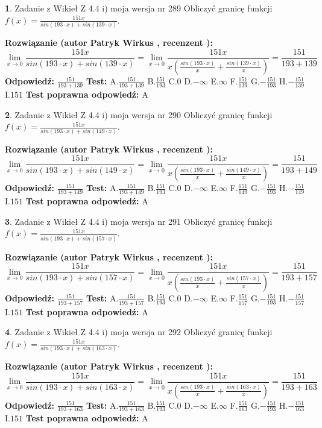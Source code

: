 \documentclass[12pt, a4paper]{article}
\theoremstyle{definition} %
\newtheorem{zad}{}
\newcommand{\zadStart}[1]{\begin{zad}#1\newline}
\newcommand{\zadStop}{\end{zad}}
\newcommand{\rozwStart}[2]{\noindent \textbf{Rozwiązanie (autor #1 , recenzent #2): }\newline}
\newcommand{\rozwStop}{\newline}
\newcommand{\odpStart}{\noindent \textbf{Odpowiedź:}\newline}
\newcommand{\odpStop}{\newline}
\newcommand{\testStart}{\noindent \textbf{Test:}\newline}
\newcommand{\testStop}{\newline}
\newcommand{\kluczStart}{\noindent \textbf{Test poprawna odpowiedź:}\newline}
\newcommand{\kluczStop}{\newline}
\begin{document}
\zadStart{Zadanie z Wikieł Z 4.4 i) moja wersja nr 289}
Obliczyć granicę funkcji $f(x)=\frac{151x}{sin(193\cdot x) +sin(139\cdot x)}$.
\zadStop
\rozwStart{Patryk Wirkus}{}
$$\lim\limits_{x\to 0}\frac{151x}{sin(193\cdot x) +sin(139\cdot x)}=\lim\limits_{x\to 0}\frac{151x}{x(\frac{sin(193\cdot x)}{x}+\frac{sin(139\cdot x)}{x})}=\frac{151}{193+139}$$
\rozwStop
\odpStart
$\frac{151}{193+139}$
\odpStop
\testStart
A.$\frac{151}{193+139}$
B.$\frac{151}{193}$
C.$0$
D.$-\infty$
E.$\infty$
F.$\frac{151}{139}$
G.$-\frac{151}{193}$
H.$-\frac{151}{139}$
I.$151$
\testStop
\kluczStart
A
\kluczStop



\zadStart{Zadanie z Wikieł Z 4.4 i) moja wersja nr 290}
Obliczyć granicę funkcji $f(x)=\frac{151x}{sin(193\cdot x) +sin(149\cdot x)}$.
\zadStop
\rozwStart{Patryk Wirkus}{}
$$\lim\limits_{x\to 0}\frac{151x}{sin(193\cdot x) +sin(149\cdot x)}=\lim\limits_{x\to 0}\frac{151x}{x(\frac{sin(193\cdot x)}{x}+\frac{sin(149\cdot x)}{x})}=\frac{151}{193+149}$$
\rozwStop
\odpStart
$\frac{151}{193+149}$
\odpStop
\testStart
A.$\frac{151}{193+149}$
B.$\frac{151}{193}$
C.$0$
D.$-\infty$
E.$\infty$
F.$\frac{151}{149}$
G.$-\frac{151}{193}$
H.$-\frac{151}{149}$
I.$151$
\testStop
\kluczStart
A
\kluczStop



\zadStart{Zadanie z Wikieł Z 4.4 i) moja wersja nr 291}
Obliczyć granicę funkcji $f(x)=\frac{151x}{sin(193\cdot x) +sin(157\cdot x)}$.
\zadStop
\rozwStart{Patryk Wirkus}{}
$$\lim\limits_{x\to 0}\frac{151x}{sin(193\cdot x) +sin(157\cdot x)}=\lim\limits_{x\to 0}\frac{151x}{x(\frac{sin(193\cdot x)}{x}+\frac{sin(157\cdot x)}{x})}=\frac{151}{193+157}$$
\rozwStop
\odpStart
$\frac{151}{193+157}$
\odpStop
\testStart
A.$\frac{151}{193+157}$
B.$\frac{151}{193}$
C.$0$
D.$-\infty$
E.$\infty$
F.$\frac{151}{157}$
G.$-\frac{151}{193}$
H.$-\frac{151}{157}$
I.$151$
\testStop
\kluczStart
A
\kluczStop



\zadStart{Zadanie z Wikieł Z 4.4 i) moja wersja nr 292}
Obliczyć granicę funkcji $f(x)=\frac{151x}{sin(193\cdot x) +sin(163\cdot x)}$.
\zadStop
\rozwStart{Patryk Wirkus}{}
$$\lim\limits_{x\to 0}\frac{151x}{sin(193\cdot x) +sin(163\cdot x)}=\lim\limits_{x\to 0}\frac{151x}{x(\frac{sin(193\cdot x)}{x}+\frac{sin(163\cdot x)}{x})}=\frac{151}{193+163}$$
\rozwStop
\odpStart
$\frac{151}{193+163}$
\odpStop
\testStart
A.$\frac{151}{193+163}$
B.$\frac{151}{193}$
C.$0$
D.$-\infty$
E.$\infty$
F.$\frac{151}{163}$
G.$-\frac{151}{193}$
H.$-\frac{151}{163}$
I.$151$
\testStop
\kluczStart
A
\kluczStop
\end{document}
